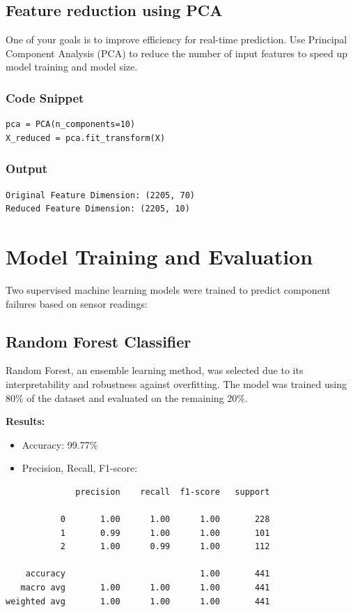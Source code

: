 \documentclass[sigconf]{acmart}
\begin{document}
\subsection{Feature reduction using PCA} 
One of your goals is to improve efficiency for real-time prediction. Use Principal Component Analysis (PCA) to reduce the number of input features to speed up model training and model size.

\subsubsection{Code Snippet}
\begin{verbatim}
pca = PCA(n_components=10)
X_reduced = pca.fit_transform(X)
\end{verbatim}

\subsubsection{Output}
\begin{verbatim}
Original Feature Dimension: (2205, 70)
Reduced Feature Dimension: (2205, 10)
\end{verbatim}






\section{Model Training and Evaluation}
Two supervised machine learning models were trained to predict component failures based on sensor readings:

\subsection{Random Forest Classifier}
Random Forest, an ensemble learning method, was selected due to its interpretability and robustness against overfitting. The model was trained using 80\% of the dataset and evaluated on the remaining 20\%.

\textbf{Results:}
\begin{itemize}
    \item Accuracy: 99.77\%
    \item Precision, Recall, F1-score:
\end{itemize}
\begin{verbatim}
              precision    recall  f1-score   support

           0       1.00      1.00      1.00       228
           1       0.99      1.00      1.00       101
           2       1.00      0.99      1.00       112

    accuracy                           1.00       441
   macro avg       1.00      1.00      1.00       441
weighted avg       1.00      1.00      1.00       441
\end{verbatim}
\end{document}
